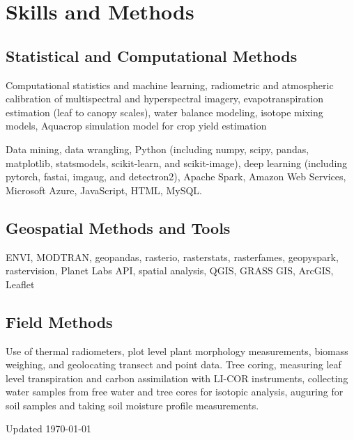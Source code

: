 \documentclass[12pt,letterpaper]{report}
\newcommand{\listitemspace}{0.15em}
\renewenvironment{itemize}
{\begin{list}{}{\setlength{\leftmargin}{0em}
			\setlength{\parskip}{0em}
			\setlength{\itemsep}{\listitemspace}
			\setlength{\parsep}{\listitemspace}}}
	{\end{list}}
\begin{document}
	
	
	\section*{Skills and Methods}
	
	\subsection*{Statistical and Computational Methods}
	
	\begin{itemize}
		
		\item Computational statistics and machine learning, radiometric and atmospheric calibration of multispectral and hyperspectral imagery, evapotranspiration estimation (leaf to canopy scales), water balance modeling, isotope mixing models, Aquacrop simulation model for crop yield estimation

        \item Data mining, data wrangling, Python (including numpy, scipy, pandas, matplotlib, statsmodels, scikit-learn, and scikit-image), deep learning (including pytorch, fastai, imgaug, and detectron2), Apache Spark, Amazon Web Services, Microsoft Azure, JavaScript, HTML, MySQL.
		
	\end{itemize}
	
	\subsection*{Geospatial Methods and Tools}
	
	\begin{itemize}
		
		\item ENVI, MODTRAN, geopandas, rasterio, rasterstats, rasterfames, geopyspark, rastervision, Planet Labs API, spatial analysis, QGIS, GRASS GIS, ArcGIS, Leaflet
		
	\end{itemize}
	
	\subsection*{Field Methods}
	
	\begin{itemize}
		
		\item Use of thermal radiometers, plot level plant morphology measurements, biomass weighing, and geolocating transect and point data. Tree coring, measuring leaf level transpiration and carbon assimilation with LI-COR instruments, collecting water samples from free water and tree cores for isotopic analysis, auguring for soil samples and taking soil moisture profile measurements.
		
	\end{itemize}
	
	
	
	\begin{center}
		\vspace{6em}
		Updated \monthyeardate\today
	\end{center}
	
	
	
\end{document}
